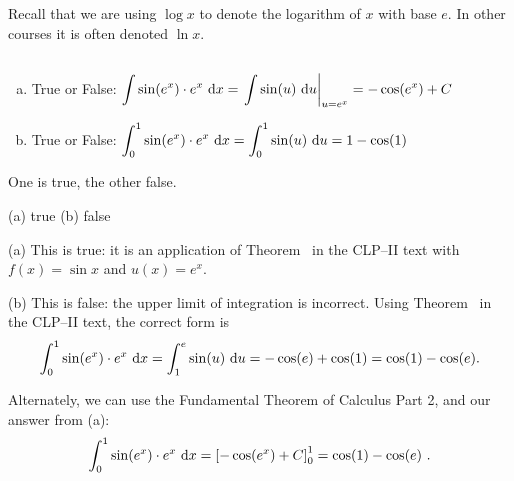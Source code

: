 %
%

\noindent
Recall that we are using $\log x$ to denote the logarithm of $x$ with
base $e$. In other courses it is often denoted $\ln x$.


\subsection*{\Conceptual}
\begin{Mquestion}\label{1.4_intbounds}
\begin{enumerate}[(a)]
\item True or False: $\displaystyle\int \sin(e^x)\cdot e^x\ \mathrm{d}x = \left.\displaystyle\int \sin(u)\ \mathrm{d}u\right|_{u=e^x} = -\cos(e^x)+C$
\item True or False: $\displaystyle\int_0^1 \sin(e^x)\cdot e^x\ \mathrm{d}x = \displaystyle\int_0^1 \sin(u)\ \mathrm{d}u = 1-\cos(1)$
\end{enumerate}
\end{Mquestion}
\begin{hint}
One is true, the other false.
\end{hint}
\begin{answer}
(a) true \qquad (b) false
\end{answer}
\begin{solution}
(a) This is true: it is an application of Theorem~ in the CLP--II text with $f(x)=\sin x$ and $u(x)=e^x$.

(b) This is false: the upper limit of integration is incorrect. Using
Theorem~ in the CLP--II text, the correct form
is \[\displaystyle\int_0^1 \sin(e^x)\cdot e^x\ \mathrm{d}x = \displaystyle\int_1^{e} \sin(u)\ \mathrm{d}u = -\cos(e) + \cos(1)
= \cos(1)-\cos(e).\]

Alternately, we can use the Fundamental Theorem of Calculus Part 2, and our answer from (a):
\[\int_0^1 \sin(e^x)\cdot e^x\ \mathrm{d}x=\left[-\cos(e^x)+C\right]_{0}^1 = \cos(1)-\cos(e)\ .\]
\end{solution}


